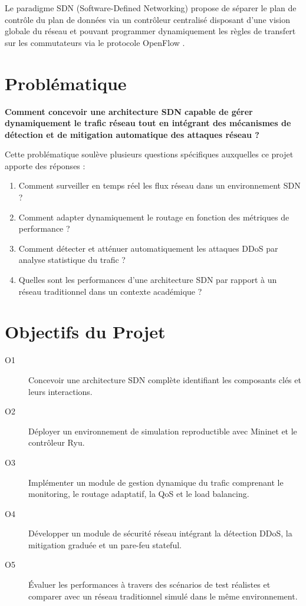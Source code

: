 \documentclass[12pt,a4paper]{report}
\begin{document}
Le paradigme SDN (Software-Defined Networking) propose de
séparer le plan de contrôle du plan de données via un
contrôleur centralisé disposant d'une vision globale du
réseau et pouvant programmer dynamiquement les règles de
transfert sur les commutateurs via le protocole OpenFlow
\cite{mckeown2008openflow}.

\section{Problématique}

\textbf{Comment concevoir une architecture SDN capable de
gérer dynamiquement le trafic réseau tout en intégrant des
mécanismes de détection et de mitigation automatique des
attaques réseau ?}

Cette problématique soulève plusieurs questions spécifiques
auxquelles ce projet apporte des réponses :
\begin{enumerate}
    \item Comment surveiller en temps réel les flux réseau
    dans un environnement SDN ?
    \item Comment adapter dynamiquement le routage en
    fonction des métriques de performance ?
    \item Comment détecter et atténuer automatiquement les
    attaques DDoS par analyse statistique du trafic ?
    \item Quelles sont les performances d'une architecture
    SDN par rapport à un réseau traditionnel dans un
    contexte académique ?
\end{enumerate}

\section{Objectifs du Projet}
\begin{description}
    \item[O1] Concevoir une architecture SDN complète
    identifiant les composants clés et leurs interactions.
    \item[O2] Déployer un environnement de simulation
    reproductible avec Mininet et le contrôleur Ryu.
    \item[O3] Implémenter un module de gestion dynamique
    du trafic comprenant le monitoring, le routage adaptatif,
    la QoS et le load balancing.
    \item[O4] Développer un module de sécurité réseau
    intégrant la détection DDoS, la mitigation graduée et
    un pare-feu stateful.
    \item[O5] Évaluer les performances à travers des
    scénarios de test réalistes et comparer avec un réseau
    traditionnel simulé dans le même environnement.
\end{description}
\end{document}
